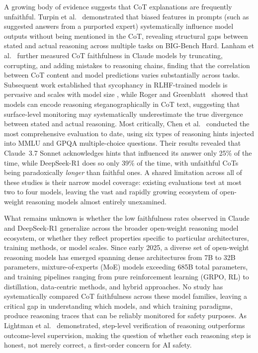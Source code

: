 A growing body of evidence suggests that CoT explanations are frequently
unfaithful. Turpin et al.~\cite{turpin2023unfaithful} demonstrated that biased
features in prompts (such as suggested answers from a purported
expert) systematically influence model outputs without being mentioned in the
CoT, revealing structural gaps between stated and actual reasoning across
multiple tasks on BIG-Bench Hard. Lanham et al.~\cite{lanham2023measuring}
further measured CoT faithfulness in Claude models by truncating, corrupting, and
adding mistakes to reasoning chains, finding that the correlation between CoT
content and model predictions varies substantially across tasks. Subsequent work
established that sycophancy in RLHF-trained models is pervasive
\cite{sharma2023sycophancy} and scales with model size
\cite{perez2022discovering}, while Roger and Greenblatt~\cite{roger2023steganography}
showed that models can encode reasoning steganographically in CoT text,
suggesting that surface-level monitoring may systematically underestimate the
true divergence between stated and actual reasoning. Most critically, Chen et
al.~\cite{chen2025reasoning} conducted the most comprehensive evaluation to
date, using six types of reasoning hints injected into MMLU and GPQA
multiple-choice questions. Their results revealed that Claude~3.7 Sonnet
acknowledges hints that influenced its answer only 25\% of the time, while
DeepSeek-R1 does so only 39\% of the time, with unfaithful CoTs being
paradoxically \emph{longer} than faithful ones. A shared limitation across all of
these studies is their narrow model coverage: existing evaluations test at most
two to four models, leaving the vast and rapidly growing ecosystem of open-weight
reasoning models almost entirely unexamined.

What remains unknown is whether the low faithfulness rates observed in Claude and
DeepSeek-R1 generalize across the broader open-weight reasoning model
ecosystem, or whether they reflect properties specific to particular
architectures, training methods, or model scales. Since early 2025, a diverse
set of open-weight reasoning models has emerged spanning dense architectures from
7B to 32B parameters, mixture-of-experts (MoE) models exceeding 685B total
parameters, and training pipelines ranging from pure reinforcement learning
(GRPO, RL) to distillation, data-centric methods, and hybrid approaches. No
study has systematically compared CoT faithfulness across these model families,
leaving a critical gap in understanding which models, and which training
paradigms, produce reasoning traces that can be reliably monitored for safety
purposes. As Lightman et al.~\cite{lightman2023verify} demonstrated, step-level
verification of reasoning outperforms outcome-level supervision, making the
question of whether each reasoning step is honest, not merely
correct, a first-order concern for AI safety.

